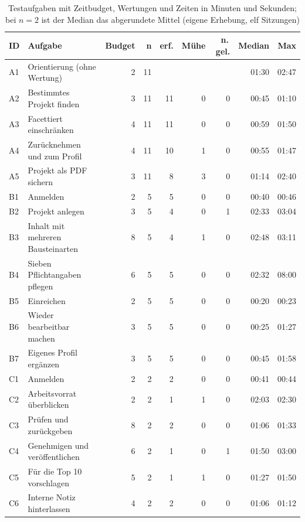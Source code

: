 \begin{table}[htbp]
	\centering
	\footnotesize
	\setlength{\tabcolsep}{3.5pt}
	\renewcommand{\arraystretch}{1.02}
	\caption[Testaufgaben mit Zeitbudget und Kennzahlen]{Testaufgaben mit Zeitbudget, Wertungen und Zeiten in Minuten und Sekunden; bei $n=2$ ist der Median das abgerundete Mittel (eigene Erhebung, elf Sitzungen)}
	\label{tab:aufgaben}
	\begin{tabular}{@{}L{0.8cm}L{5.4cm}rrrrrrr@{}}
	\toprule
	\textbf{ID} & \textbf{Aufgabe} & \textbf{Budget} & \textbf{n} & \textbf{erf.} & \textbf{Mühe} & \textbf{n.\,gel.} & \textbf{Median} & \textbf{Max} \\
	\midrule
	A1 & Orientierung (ohne Wertung) & 2 & 11 & & & & 01:30 & 02:47 \\
	A2 & Bestimmtes Projekt finden & 3 & 11 & 11 & 0 & 0 & 00:45 & 01:10 \\
	A3 & Facettiert einschränken & 4 & 11 & 11 & 0 & 0 & 00:59 & 01:50 \\
	A4 & Zurücknehmen und zum Profil & 4 & 11 & 10 & 1 & 0 & 00:55 & 01:47 \\
	A5 & Projekt als PDF sichern & 3 & 11 & 8 & 3 & 0 & 01:14 & 02:40 \\
	B1 & Anmelden & 2 & 5 & 5 & 0 & 0 & 00:40 & 00:46 \\
	B2 & Projekt anlegen & 3 & 5 & 4 & 0 & 1 & 02:33 & 03:04 \\
	B3 & Inhalt mit mehreren Bausteinarten & 8 & 5 & 4 & 1 & 0 & 02:48 & 03:11 \\
	B4 & Sieben Pflichtangaben pflegen & 6 & 5 & 5 & 0 & 0 & 02:32 & 08:00 \\
	B5 & Einreichen & 2 & 5 & 5 & 0 & 0 & 00:20 & 00:23 \\
	B6 & Wieder bearbeitbar machen & 3 & 5 & 5 & 0 & 0 & 00:25 & 01:27 \\
	B7 & Eigenes Profil ergänzen & 3 & 5 & 5 & 0 & 0 & 00:45 & 01:58 \\
	C1 & Anmelden & 2 & 2 & 2 & 0 & 0 & 00:41 & 00:44 \\
	C2 & Arbeitsvorrat überblicken & 2 & 2 & 1 & 1 & 0 & 02:03 & 02:30 \\
	C3 & Prüfen und zurückgeben & 8 & 2 & 2 & 0 & 0 & 01:06 & 01:33 \\
	C4 & Genehmigen und veröffentlichen & 6 & 2 & 1 & 0 & 1 & 01:50 & 03:00 \\
	C5 & Für die Top 10 vorschlagen & 5 & 2 & 1 & 1 & 0 & 01:27 & 01:50 \\
	C6 & Interne Notiz hinterlassen & 4 & 2 & 2 & 0 & 0 & 01:06 & 01:12 \\

\end{tabular}
\end{table}
